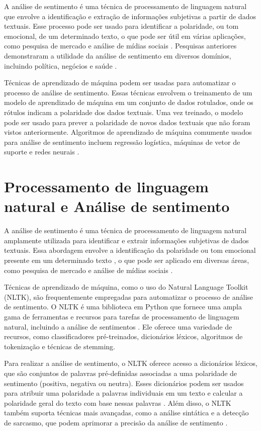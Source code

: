 A análise de sentimento é uma técnica de processamento de linguagem natural que envolve a identificação e extração de informações subjetivas a partir de dados textuais. Esse processo pode ser usado para identificar a polaridade, ou tom emocional, de um determinado texto, o que pode ser útil em várias aplicações, como pesquisa de mercado e análise de mídias sociais \cite{2008_Pang}. Pesquisas anteriores demonstraram a utilidade da análise de sentimento em diversos domínios, incluindo política, negócios e saúde \cite{2016_Chen_IP}.

Técnicas de aprendizado de máquina podem ser usadas para automatizar o processo de análise de sentimento. Essas técnicas envolvem o treinamento de um modelo de aprendizado de máquina em um conjunto de dados rotulados, onde os rótulos indicam a polaridade dos dados textuais. Uma vez treinado, o modelo pode ser usado para prever a polaridade de novos dados textuais que não foram vistos anteriormente. Algoritmos de aprendizado de máquina comumente usados para análise de sentimento incluem regressão logística, máquinas de vetor de suporte e redes neurais \cite{2013_Haddi}.

\section{Processamento de linguagem natural e Análise de sentimento}

A análise de sentimento é uma técnica de processamento de linguagem natural amplamente utilizada para identificar e extrair informações subjetivas de dados textuais. Essa abordagem envolve a identificação da polaridade ou tom emocional presente em um determinado texto \cite{2008_Pang}, o que pode ser aplicado em diversas áreas, como pesquisa de mercado e análise de mídias sociais \cite{2015_Nguyen}.

Técnicas de aprendizado de máquina, como o uso do Natural Language Toolkit (NLTK), são frequentemente empregadas para automatizar o processo de análise de sentimento. O NLTK é uma biblioteca em Python que fornece uma ampla gama de ferramentas e recursos para tarefas de processamento de linguagem natural, incluindo a análise de sentimentos \cite{2009_Bird_BOOK}. Ele oferece uma variedade de recursos, como classificadores pré-treinados, dicionários léxicos, algoritmos de tokenização e técnicas de stemming.

Para realizar a análise de sentimento, o NLTK oferece acesso a dicionários léxicos, que são conjuntos de palavras pré-definidas associadas a uma polaridade de sentimento (positiva, negativa ou neutra). Esses dicionários podem ser usados para atribuir uma polaridade a palavras individuais em um texto e calcular a polaridade geral do texto com base nessas palavras \cite{2012_Souza_IP}. Além disso, o NLTK também suporta técnicas mais avançadas, como a análise sintática e a detecção de sarcasmo, que podem aprimorar a precisão da análise de sentimento \cite{2014_Hutto}.

